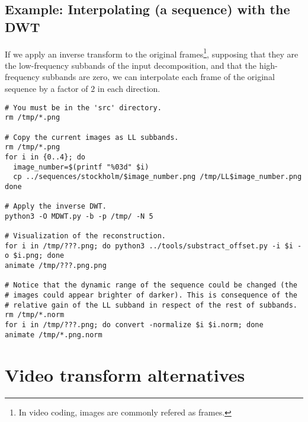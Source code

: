 
\subsection*{Example: Interpolating (a sequence) with the DWT}

If we apply an inverse transform to the original frames\footnote{In
  video coding, images are commonly refered as frames.}, supposing
that they are the low-frequency subbands of the input decomposition,
and that the high-frequency subbands are zero, we can interpolate each
frame of the original sequence by a factor of $2$ in each direction.

\begin{verbatim}
# You must be in the 'src' directory.
rm /tmp/*.png

# Copy the current images as LL subbands.
rm /tmp/*.png
for i in {0..4}; do
  image_number=$(printf "%03d" $i)
  cp ../sequences/stockholm/$image_number.png /tmp/LL$image_number.png
done

# Apply the inverse DWT.
python3 -O MDWT.py -b -p /tmp/ -N 5

# Visualization of the reconstruction.
for i in /tmp/???.png; do python3 ../tools/substract_offset.py -i $i -o $i.png; done
animate /tmp/???.png.png

# Notice that the dynamic range of the sequence could be changed (the
# images could appear brighter of darker). This is consequence of the
# relative gain of the LL subband in respect of the rest of subbands.
rm /tmp/*.norm
for i in /tmp/???.png; do convert -normalize $i $i.norm; done
animate /tmp/*.png.norm
\end{verbatim}



\section{Video transform alternatives}

